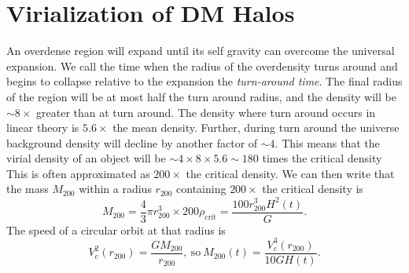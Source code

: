 \documentclass[]{article}
\begin{document}
\section{Virialization of DM Halos}
An overdense region will expand until its self gravity can
overcome the universal expansion. We call the time when the
radius of the overdensity turns around and begins to collapse
relative to the expansion the {\it turn-around time}.  The
final radius of the region will be at most half the turn around
radius, and the density will be $\sim 8\times$ greater than at
turn around.  The density where turn around occurs in linear
theory is $5.6\times$ the mean density.  Further, during turn
around the universe background density will decline by another
factor of $\sim4$.  This means that the virial density of an
object will be $\sim4\times8\times5.6\sim180$ times the critical
density  This is often approximated as $200\times$ the critical
density.  We can then write that the mass $M_{200}$ within a radius $r_{200}$
containing $200\times$ the critical density is
\begin{equation}
M_{200} = \frac{4}{3}\pi r_{200}^3 \times 200 \rho_{\mathrm{crit}} = \frac{100 r_{200}^3 H^2(t)}{G}.
\end{equation}
\noindent
The speed of a circular orbit at that radius is
\begin{equation}
V_c^2(r_{200}) = \frac{GM_{200}}{r_{200}},~\mathrm{so}~M_{200}(t)=\frac{V_c^3(r_{200})}{10GH(t)}.
\end{equation}
\end{document}

